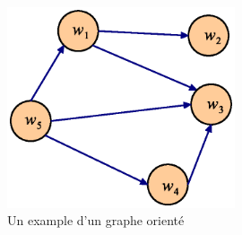 \begin{figure}[!h]
  \centering
  \includegraphics[width=0.6\textwidth]{figs/query-graph-example.eps}
  \caption{Un example d'un graphe orienté}
  \label{fig:query-graph-example}
\end{figure}

